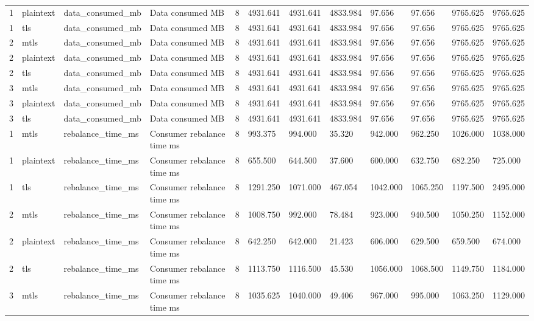 \begin{longtable}{llllllllllll}
1 & plaintext & data\_consumed\_mb & Data consumed MB & 8 & 4931.641 & 4931.641 & 4833.984 & 97.656 & 97.656 & 9765.625 & 9765.625 \\
1 & tls & data\_consumed\_mb & Data consumed MB & 8 & 4931.641 & 4931.641 & 4833.984 & 97.656 & 97.656 & 9765.625 & 9765.625 \\
2 & mtls & data\_consumed\_mb & Data consumed MB & 8 & 4931.641 & 4931.641 & 4833.984 & 97.656 & 97.656 & 9765.625 & 9765.625 \\
2 & plaintext & data\_consumed\_mb & Data consumed MB & 8 & 4931.641 & 4931.641 & 4833.984 & 97.656 & 97.656 & 9765.625 & 9765.625 \\
2 & tls & data\_consumed\_mb & Data consumed MB & 8 & 4931.641 & 4931.641 & 4833.984 & 97.656 & 97.656 & 9765.625 & 9765.625 \\
3 & mtls & data\_consumed\_mb & Data consumed MB & 8 & 4931.641 & 4931.641 & 4833.984 & 97.656 & 97.656 & 9765.625 & 9765.625 \\
3 & plaintext & data\_consumed\_mb & Data consumed MB & 8 & 4931.641 & 4931.641 & 4833.984 & 97.656 & 97.656 & 9765.625 & 9765.625 \\
3 & tls & data\_consumed\_mb & Data consumed MB & 8 & 4931.641 & 4931.641 & 4833.984 & 97.656 & 97.656 & 9765.625 & 9765.625 \\
1 & mtls & rebalance\_time\_ms & Consumer rebalance time ms & 8 & 993.375 & 994.000 & 35.320 & 942.000 & 962.250 & 1026.000 & 1038.000 \\
1 & plaintext & rebalance\_time\_ms & Consumer rebalance time ms & 8 & 655.500 & 644.500 & 37.600 & 600.000 & 632.750 & 682.250 & 725.000 \\
1 & tls & rebalance\_time\_ms & Consumer rebalance time ms & 8 & 1291.250 & 1071.000 & 467.054 & 1042.000 & 1065.250 & 1197.500 & 2495.000 \\
2 & mtls & rebalance\_time\_ms & Consumer rebalance time ms & 8 & 1008.750 & 992.000 & 78.484 & 923.000 & 940.500 & 1050.250 & 1152.000 \\
2 & plaintext & rebalance\_time\_ms & Consumer rebalance time ms & 8 & 642.250 & 642.000 & 21.423 & 606.000 & 629.500 & 659.500 & 674.000 \\
2 & tls & rebalance\_time\_ms & Consumer rebalance time ms & 8 & 1113.750 & 1116.500 & 45.530 & 1056.000 & 1068.500 & 1149.750 & 1184.000 \\
3 & mtls & rebalance\_time\_ms & Consumer rebalance time ms & 8 & 1035.625 & 1040.000 & 49.406 & 967.000 & 995.000 & 1063.250 & 1129.000 \\

\end{longtable}
